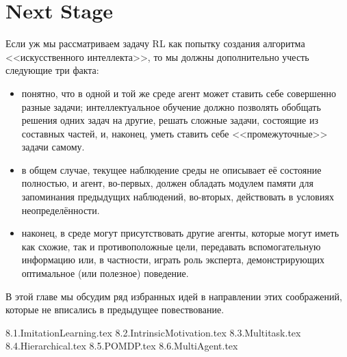 \documentclass[../main.tex]{subfiles}
\begin{document}
\chapter{Next Stage}

Если уж мы рассматриваем задачу RL как попытку создания алгоритма <<искусственного интеллекта>>, то мы должны дополнительно учесть следующие три факта:
\begin{itemize}
    \item понятно, что в одной и той же среде агент может ставить себе совершенно разные задачи; интеллектуальное обучение должно позволять обобщать решения одних задач на другие, решать сложные задачи, состоящие из составных частей, и, наконец, уметь ставить себе <<промежуточные>> задачи самому.
    \item в общем случае, текущее наблюдение среды не описывает её состояние полностью, и агент, во-первых, должен обладать модулем памяти для запоминания предыдущих наблюдений, во-вторых, действовать в условиях неопределённости.
    \item наконец, в среде могут присутствовать другие агенты, которые могут иметь как схожие, так и противоположные цели, передавать вспомогательную информацию или, в частности, играть роль эксперта, демонстрирующих оптимальное (или полезное) поведение.
\end{itemize}
В этой главе мы обсудим ряд избранных идей в направлении этих соображений, которые не вписались в предыдущее повествование. 

{8.1.ImitationLearning.tex}
{8.2.IntrinsicMotivation.tex}
{8.3.Multitask.tex}
{8.4.Hierarchical.tex}
{8.5.POMDP.tex}
{8.6.MultiAgent.tex}
\end{document}
